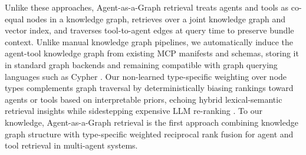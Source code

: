 \documentclass[a4paper,twoside]{article}
\begin{document}
Unlike these approaches, Agent-as-a-Graph retrieval treats agents and tools as co-equal nodes in a knowledge graph, retrieves over a joint knowledge graph and vector index, and traverses tool-to-agent edges at query time to preserve bundle context. Unlike manual knowledge graph pipelines, we automatically induce the agent-tool knowledge graph from existing MCP manifests and schemas, storing it in standard graph backends and remaining compatible with graph querying languages such as Cypher \cite{neo4j,ozsoy2024text2cypherbridgingnaturallanguage}. Our non-learned type-specific weighting over node types complements graph traversal by deterministically biasing rankings toward agents or tools based on interpretable priors, echoing hybrid lexical-semantic retrieval insights while sidestepping expensive LLM re-ranking \cite{robertson_probabilistic_2009,kuzi2020leveragingsemanticlexicalmatching,sun_is_2023,yan_corrective_2024}. To our knowledge, Agent-as-a-Graph retrieval is the first approach combining knowledge graph structure with type-specific weighted reciprocal rank fusion for agent and tool retrieval in multi-agent systems.



\end{document}
